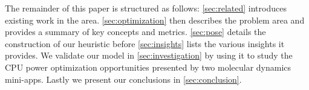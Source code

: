 The remainder of this paper is structured as follows: \autoref{sec:related} introduces existing work in the area. 
\autoref{sec:optimization} then describes the problem area and provides a summary of key concepts and metrics.
\autoref{sec:pose} details the construction of our heuristic before \autoref{sec:insights} lists the various insights it provides.
We validate our model in \autoref{sec:investigation} by using it to study the CPU power optimization opportunities presented by two molecular dynamics mini-apps. 
Lastly we present our conclusions in \autoref{sec:conclusion}.
